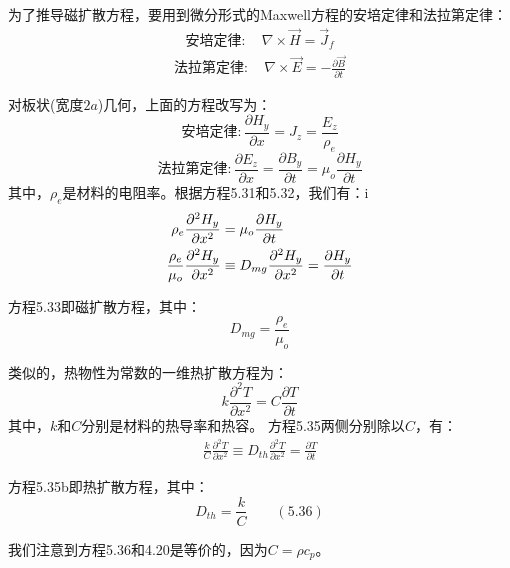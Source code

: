 为了推导磁扩散方程，要用到微分形式的Maxwell方程的安培定律和法拉第定律：
\begin{align*}%
\mbox{安培定律}:\quad \nabla\times\vec{H}=\vec{J}_{f}\tag{2.5}
\end{align*}
\begin{align*}%
\mbox{法拉第定律}:\quad\nabla\times\vec{E}=-\frac{\partial\vec{B}}{\partial t}\tag{2.8}
\end{align*}

对板状(宽度$2a$)几何，上面的方程改写为：
\begin{equation}%
\mbox{安培定律}: \frac{\partial H_{y}}{\partial x}=J_{z}=\frac{E_{z}}{\rho_{e}}
\end{equation}
\begin{equation}%
\mbox{法拉第定律}:\frac{\partial E_{z}}{\partial x}=\frac{\partial B_{y}}{\partial t}=\mu_{o}\frac{\partial H_{y}}{\partial t}
\end{equation}
其中，$\rho_e$是材料的电阻率。根据方程5.31和5.32，我们有：i
\begin{align}%
\rho_{e}\frac{\partial^{2}H_{y}}{\partial x^{2}}&=\mu_{o}\frac{\partial H_{y}}{\partial t}\\\notag
\frac{\rho_{e}}{\mu_{o}}\frac{\partial^{2}H_{y}}{\partial x^{2}}&\equiv D_{mg}\frac{\partial^{2}H_{y}}{\partial x^{2}}=\frac{\partial H_{y}}{\partial t}
\end{align}

方程5.33即磁扩散方程，其中：
\begin{equation}%
D_{mg}=\frac{{\rho}_{e}}{\mu_{o}}
\end{equation}

类似的，热物性为常数的一维热扩散方程为：
\begin{equation}%
k\frac{\partial^{2}T}{\partial x^{2}}=C\frac{\partial T}{\partial t}
\end{equation}
其中，$k$和$C$分别是材料的热导率和热容。
方程5.35两侧分别除以$C$，有：
\begin{align*}%
\frac{k}{C}\frac{\partial^{2}T}{\partial x^{2}}\equiv D_{th}\frac{\partial^{2}T}{\partial x^{2}}=\frac{\partial T}{\partial t}\tag{5.35b}
\end{align*}

方程5.35b即热扩散方程，其中：
\begin{equation}%
D_{th}=\frac{k}{C}\qquad(5.36)
\end{equation}

我们注意到方程5.36和4.20是等价的，因为$C=\rho c_p$。

